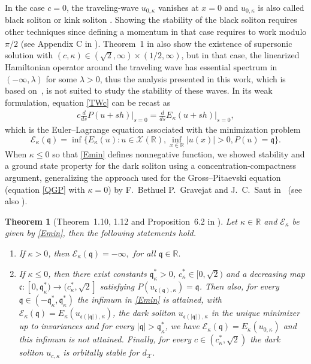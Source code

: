 \documentclass[11pt]{article}
\newcommand{\R}{\mathbb{R}}
\theoremstyle{plain}
\newtheorem{theorem}{Theorem}[section]
\theoremstyle{definition}
\theoremstyle{remark}
\numberwithin{equation}{section}
\begin{document}
{	In the case $c=0$, the traveling-wave $u_{0,\kappa}$ vanishes at $x=0$ and $u_{0,\kappa}$ is also called black soliton or kink soliton \cite{chironexistence1d,bethuel2008existence}. Showing the stability of the black soliton requires other techniques \cite{bethuel-black,chiron-stability} since defining a momentum in that case requires to work modulo $\pi/2$ (see Appendix C in \cite{deLGrSm1}). Theorem~1 in \cite{delaire2023exotic} also show the existence of supersonic solution with $(c,\kappa)\in(\sqrt{2},\infty)\times(1/2,\infty)$, but in that case, the
	linearized Hamiltonian operator around the traveling wave has essential spectrum in $(-\infty,\lambda)$ for some $\lambda>0$, thus the analysis presented in this work, which is based on~\cite{linbubbles}, is not suited to study the stability of these waves. 
	In its weak formulation, equation \eqref{TWc} can be recast as 
	$$\begin{aligned}
		c\frac{d}{d s}P(u+sh)\rvert_{s=0}=\frac{d}{d s}E_\kappa(u+sh)\rvert_{s=0},
	\end{aligned}$$
	which is the Euler--Lagrange equation associated with the minimization problem
	\begin{equation}\label{Emin}
		\mathcal{E}_\kappa(\mathfrak{q})=\inf\{E_\kappa(u):u\in\mathcal{X}(\R),\inf_{x\in\R}|u(x)|>0,P(u)=\mathfrak{q}\}.
	\end{equation} 
	When $\kappa\leq0$ so that \eqref{Emin} defines nonnegative function, we showed stability and a ground state property for the dark soliton using a concentration-compactness argument, generalizing the approach used for the Gross--Pitaevski equation (equation \eqref{QGP} with $\kappa=0$) by F.~Bethuel P.~Gravejat and J.~C.~Saut in~\cite{bethuel2008existence} (see also \cite{delaire-mennuni}).
	\begin{theorem}[Theorem~1.10, 1.12 and Proposition~6.2 in \cite{delaire2023exotic}]\label{thm:min}
		Let $\kappa\in\R$ and $\mathcal{E}_\kappa$ be given by \eqref{Emin}, then the following statements hold.
		\begin{enumerate}
			\item If $\kappa>0$, then $\mathcal{E}_\kappa(\mathfrak{q})=-\infty,$ for all $\mathfrak{q}\in\R.$
			\item If $\kappa\leq0$, then there exist constants $\mathfrak{q}_\kappa^*>0$, $c_\kappa^*\in[0,\sqrt2)$  and a decreasing map $\mathfrak{c}:[0,\mathfrak{q}_\kappa^*)\to(c_\kappa^*,\sqrt{2}]$ satisfying $P(u_{\mathfrak{c}(\mathfrak{q}),\kappa})=\mathfrak{q}$. Then also, for every $\mathfrak{q}\in(-\mathfrak{q}_\kappa^*,\mathfrak{q}_\kappa^*)$ the infimum in \eqref{Emin} is attained, with $\mathcal{E}_\kappa(\mathfrak{q})=E_\kappa(u_{\mathfrak{c}(|\mathfrak{q}|),\kappa})$, the dark soliton $u_{\mathfrak{c}(|\mathfrak{q}|),\kappa}$ in the unique minimizer up to invariances and for every $|\mathfrak{q}|> \mathfrak{q}_\kappa^*$, we have $\mathcal{E}_\kappa(\mathfrak{q})=E_\kappa(u_{0,\kappa})$ and this infimum is not attained. Finally, for every $c\in(c_\kappa^*,\sqrt{2})$ the dark soliton $u_{c,\kappa}$ is orbitally stable for $d_\mathcal{X}$.

\end{enumerate}
\end{theorem}}
\end{document}
